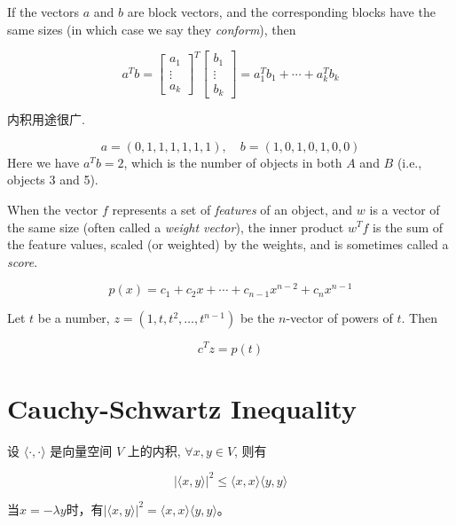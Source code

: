 \begin{definition}
    If the vectors $ a $ and $ b $ are block vectors, and the corresponding blocks have the same sizes (in which case we say they \textit{conform}), then 

    $$ a^{T} b=\left[\begin{array}{c}a_{1} \\ \vdots \\ a_{k}\end{array}\right]^{T}\left[\begin{array}{c}b_{1} \\ \vdots \\ b_{k}\end{array}\right]=a_{1}^{T} b_{1}+\cdots+a_{k}^{T} b_{k} $$
\end{definition}

内积用途很广.

\begin{example}[计算同时出现的项目数]
   $$
a=(0,1,1,1,1,1,1), \quad b=(1,0,1,0,1,0,0)
$$
Here we have $ a^{T} b=2 $, which is the number of objects in both $ A $ and $ B $ (i.e., objects 3 and 5). 
\end{example}

\begin{example}
    When the vector $f$ represents a set of \textit{features} of
    an object, and $w$ is a vector of the same size (often called a \textit{weight vector}), the
    inner product $w^T f$ is the sum of the feature values, scaled (or weighted) by
    the weights, and is sometimes called a \textit{score}.
\end{example}

\begin{example}
    $$ p(x)=c_{1}+c_{2} x+\cdots+c_{n-1} x^{n-2}+c_{n} x^{n-1} $$

    Let $t$ be a number, $ z=\left(1, t, t^{2}, \ldots, t^{n-1}\right) $  be the $n$-vector of powers
    of $t$. Then

    $$ c^{T} z=p(t) $$
\end{example}


\section{Cauchy-Schwartz Inequality}
\begin{theorem}
    \label{thm:cauchy-schwartz=inequality}
    设 \( \langle \cdot,\cdot \rangle \) 是向量空间 \( V \) 上的内积, \( \forall x, y \in V \), 则有

    $$
|\langle x, y\rangle|^{2} \leq\langle x, x\rangle\langle y, y\rangle
$$

    当$x=-\lambda y$时，有$|\langle x, y\rangle|^{2}=\langle x, x\rangle\langle y, y\rangle$。
\end{theorem}

